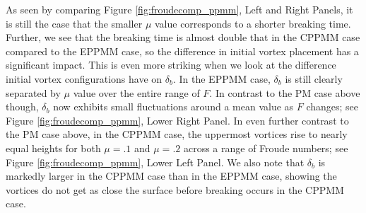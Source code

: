 \documentclass[a4paper,11pt]{article}
\begin{document}
As seen by comparing Figure \ref{fig:froudecomp_ppmm}, Left and Right Panels, it is still the case that the smaller $\mu$ value corresponds to a shorter breaking time.  Further, we see that the breaking time is almost double that in the CPPMM case compared to the EPPMM case, so the difference in initial vortex placement has a significant impact.  This is even more striking when we look at the difference initial vortex configurations have on $\delta_{b}$.  In the EPPMM case, $\delta_{b}$ is still clearly separated by $\mu$ value over the entire range of $F$.  In contrast to the PM case above though, $\delta_{b}$ now exhibits small fluctuations around a mean value as $F$ changes; see Figure \ref{fig:froudecomp_ppmm}, Lower Right Panel.  In even further contrast to the PM case above, in the CPPMM case, the uppermost vortices rise to nearly equal heights for both $\mu=.1$ and $\mu=.2$ across a range of Froude numbers; see Figure \ref{fig:froudecomp_ppmm}, Lower Left Panel.  We also note that $\delta_{b}$ is markedly larger in the CPPMM case than in the EPPMM case, showing the vortices do not get as close the surface before breaking occurs in the CPPMM case. 
%
\end{document}
